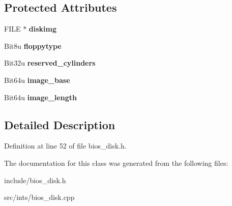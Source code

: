 \subsection*{Protected Attributes}
\begin{DoxyCompactItemize}
\item 
\hypertarget{classimageDisk_a97c3a05f12f94a92cf6ddac3f2a5dc5b}{F\-I\-L\-E $\ast$ {\bfseries diskimg}}\label{classimageDisk_a97c3a05f12f94a92cf6ddac3f2a5dc5b}

\item 
\hypertarget{classimageDisk_a6e6e4381d5627cb1516a6ced5e1a0b67}{Bit8u {\bfseries floppytype}}\label{classimageDisk_a6e6e4381d5627cb1516a6ced5e1a0b67}

\item 
\hypertarget{classimageDisk_a6588490a427230feac862942f34e401b}{Bit32u {\bfseries reserved\-\_\-cylinders}}\label{classimageDisk_a6588490a427230feac862942f34e401b}

\item 
\hypertarget{classimageDisk_aa12b7c8c8b8bc9745dd93a10d13d89b9}{Bit64u {\bfseries image\-\_\-base}}\label{classimageDisk_aa12b7c8c8b8bc9745dd93a10d13d89b9}

\item 
\hypertarget{classimageDisk_a97b1733c20d7a8e9a7479b268f75f074}{Bit64u {\bfseries image\-\_\-length}}\label{classimageDisk_a97b1733c20d7a8e9a7479b268f75f074}

\end{DoxyCompactItemize}


\subsection{Detailed Description}


Definition at line 52 of file bios\-\_\-disk.\-h.



The documentation for this class was generated from the following files\-:\begin{DoxyCompactItemize}
\item 
include/bios\-\_\-disk.\-h\item 
src/ints/bios\-\_\-disk.\-cpp\end{DoxyCompactItemize}
